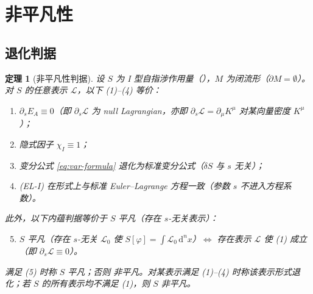 \documentclass[12pt,a4paper]{article}
\newtheorem{theorem}{定理}[section]
\theoremstyle{definition}
\newcommand{\mL}{\mathcal{L}}
\newcommand{\diff}{\mathrm{d}}
\newcommand{\chiI}{\chi_I}
\newcommand{\dVol}{\,\diff^n x}
\begin{document}
\section{非平凡性}
\label{sec:nontriv}

\subsection{退化判据}

\begin{theorem}[非平凡性判据]
\label{thm:p12}
设 $S$ 为 I 型自指涉作用量（），$M$ 为闭流形（$\partial M = \emptyset$）。对 $S$ 的\emph{任意}表示 $\mL$，以下 (1)--(4) 等价：
\begin{enumerate}[leftmargin=*]
\item $\partial_s E_A \equiv 0$（即 $\partial_s \mL$ 为 null Lagrangian，亦即 $\partial_s \mL = \partial_\mu K^\mu$ 对某向量密度 $K^\mu$）；
\item 隐式因子 $\chiI \equiv 1$；
\item 变分公式 \eqref{eq:var-formula} 退化为标准变分公式（$\delta S$ 与 $s$ 无关）；
\item (EL-I) 在形式上与标准 Euler--Lagrange 方程一致（参数 $s$ 不进入方程系数）。
\end{enumerate}
此外，以下内蕴判据等价于 $S$ 平凡（存在 $s$-无关表示）：
\begin{enumerate}[leftmargin=*]\setcounter{enumi}{4}
\item $S$ 平凡（存在 $s$-无关 $\mL_0$ 使 $S[\varphi] = \int \mL_0 \dVol$）$\iff$ 存在表示 $\mL$ 使 (1) 成立（即 $\partial_s \mL \equiv 0$）。
\end{enumerate}
满足 (5) 时称 $S$ \emph{平凡}；否则 \emph{非平凡}。对某表示满足 (1)--(4) 时称该表示\emph{形式退化}；若 $S$ 的\emph{所有}表示均不满足 (1)，则 $S$ 非平凡。
\end{theorem}
\end{document}
